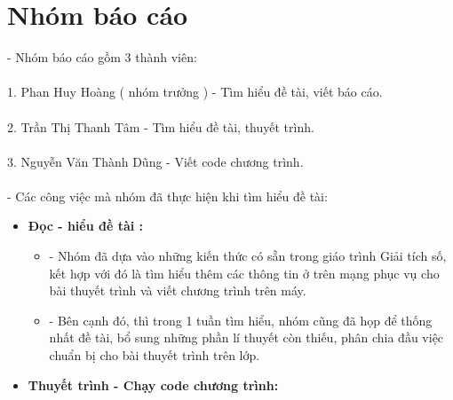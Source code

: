 \documentclass[12pt,a4paper]{article}
\begin{document}
\section{Nhóm báo cáo} 
{\renewcommand{\labelitemi}{$\blacksquare$}
\renewcommand\labelitemii{$\nabla$}
\renewcommand\labelitemiii{$\square$}

\hspace{0.7cm}- Nhóm báo cáo gồm 3 thành viên:\\

\\

\hspace{0.7cm}1. Phan Huy Hoàng ( nhóm trưởng ) - Tìm hiểu đề tài, viết báo cáo.\\

\\

\hspace{0.7cm}2. Trần Thị Thanh Tâm - Tìm hiểu đề tài, thuyết trình.\\

\\

\hspace{0.7cm}3. Nguyễn Văn Thành Dũng - Viết code chương trình.\\

\\

- Các công việc mà nhóm đã thực hiện khi tìm hiểu đề tài:\\

\begin{itemize}

\item{\textbf{Đọc - hiểu đề tài :}}
\begin{itemize}

\item - Nhóm đã dựa vào những kiến thức có sẵn trong giáo trình Giải tích số, kết hợp với đó là tìm hiểu thêm các thông tin ở trên mạng phục vụ cho bài thuyết trình và viết chương trình trên máy.\\

\item - Bên cạnh đó, thì trong 1 tuần tìm hiểu, nhóm cũng đã họp để thống nhất đề tài, bổ sung những phần lí thuyết còn thiếu, phân chia đầu việc chuẩn bị cho bài thuyết trình trên lớp.\\

\end{itemize}

\item{\textbf{Thuyết trình - Chạy code chương trình:}}
\begin{itemize}


\end{itemize}
\end{itemize}}
\end{document}
